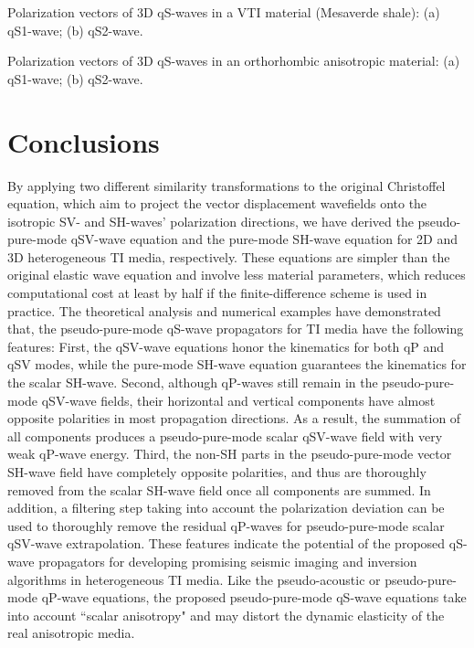 {
Polarization vectors of 3D qS-waves in a VTI material (Mesaverde shale): (a) qS1-wave; (b) qS2-wave.
}

{
Polarization vectors of 3D qS-waves in an orthorhombic anisotropic material: (a) qS1-wave; (b) qS2-wave.
}

%
\section{Conclusions}
By applying two different similarity transformations to the original Christoffel equation, which aim to project the vector displacement
wavefields onto the isotropic SV- and SH-waves' polarization directions, we have derived the pseudo-pure-mode qSV-wave equation
and the pure-mode SH-wave equation for 2D and 3D heterogeneous TI media, respectively.
These equations are simpler than the original elastic wave equation and involve less material parameters, which reduces computational
cost at least by half if the finite-difference scheme is used in practice.
The theoretical analysis and numerical examples have demonstrated that, the pseudo-pure-mode
qS-wave propagators for TI media have the following features:
First, the qSV-wave equations honor the kinematics for both qP and qSV modes, while the pure-mode SH-wave equation guarantees
the kinematics for the scalar SH-wave.
Second, although qP-waves still remain in the pseudo-pure-mode qSV-wave fields, their horizontal and vertical components have almost
opposite polarities in most propagation directions. As a result, the summation of all components
produces a pseudo-pure-mode scalar qSV-wave field with very weak qP-wave energy. 
Third, the non-SH parts in the pseudo-pure-mode vector SH-wave field have completely opposite polarities,
and thus are thoroughly removed from the scalar SH-wave field once all components are summed.
In addition, 
a filtering step taking into account the polarization deviation can be used to thoroughly remove the residual qP-waves
for pseudo-pure-mode scalar qSV-wave extrapolation.
These features indicate the potential of the proposed qS-wave propagators for developing promising seismic imaging and
inversion algorithms in heterogeneous TI media.
Like the pseudo-acoustic or pseudo-pure-mode qP-wave equations,
the proposed pseudo-pure-mode qS-wave equations take into account ``scalar anisotropy" and may distort the dynamic elasticity
of the real anisotropic media.

